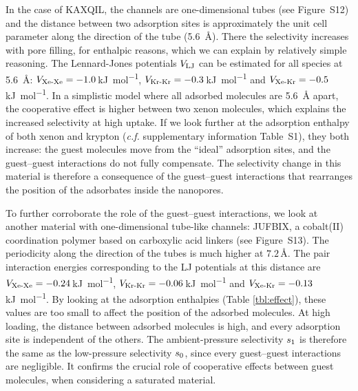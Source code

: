 \documentclass[main]{subfiles}
\begin{document}
  In the case of KAXQIL, the channels are one-dimensional tubes (see Figure~S12) and the distance between two adsorption sites is approximately the unit cell parameter along the direction of the tube (\SI{5.6}{\angstrom}). There the selectivity increases with pore filling, for enthalpic reasons, which we can explain by relatively simple reasoning. The Lennard-Jones potentials $V_{\text{LJ}}$ can be estimated for all species at \SI{5.6}{\angstrom}: $V_{\text{Xe-Xe}}=-1.0$\,\si{\kilo\joule\per\mol}, $V_{\text{Kr-Kr}}=-0.3$\,\si{\kilo\joule\per\mol} and $V_{\text{Xe-Kr}}=-0.5$\,\si{\kilo\joule\per\mol}. In a simplistic model where all adsorbed molecules are \SI{5.6}{\angstrom} apart, the cooperative effect is higher between two xenon molecules, which explains the increased selectivity at high uptake. If we look further at the adsorption enthalpy of both xenon and krypton (\emph{c.f.} supplementary information Table~S1), they both increase: the guest molecules move from the ``ideal'' adsorption sites, and the guest--guest interactions do not fully compensate. The selectivity change in this material is therefore a consequence of the guest--guest interactions that rearranges the position of the adsorbates inside the nanopores.
  
  To further corroborate the role of the guest--guest interactions, we look at another material with one-dimensional tube-like channels: JUFBIX, a cobalt(II) coordination polymer based on carboxylic acid linkers (see Figure~S13).\cite{JUFBIX} The periodicity along the direction of the tubes is much higher at $7.2$\,\si{\angstrom}. The pair interaction energies corresponding to the LJ potentials at this distance are $V_{\text{Xe-Xe}}=-0.24$\,\si{\kilo\joule\per\mol}, $V_{\text{Kr-Kr}}=-0.06$\,\si{\kilo\joule\per\mol} and $V_{\text{Xe-Kr}}=-0.13$\,\si{\kilo\joule\per\mol}. By looking at the adsorption enthalpies (Table \ref{tbl:effect}), these values are too small to affect the position of the adsorbed molecules. At high loading, the distance between adsorbed molecules is high, and every adsorption site is independent of the others. The ambient-pressure selectivity $s_{\text{1}}$ is therefore the same as the low-pressure selectivity $s_{\text{0}}$, since every guest--guest interactions are negligible. It confirms the crucial role of cooperative effects between guest molecules, when considering a saturated material.
  
\end{document}
